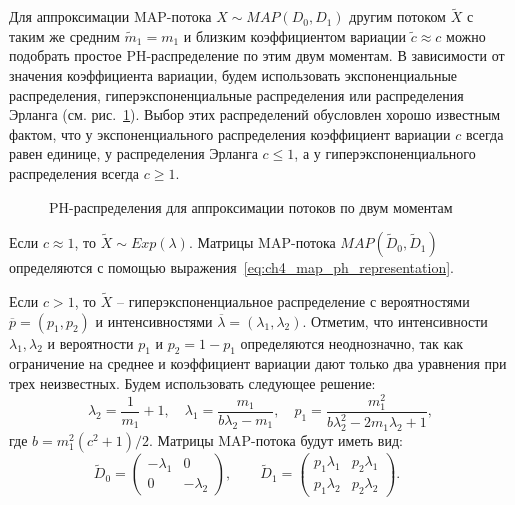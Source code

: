 Для аппроксимации MAP-потока $X \sim MAP(D_0, D_1)$ другим потоком $\tilde{X}$ с таким же средним $\tilde{m}_1 = m_1$ и близким коэффициентом вариации $\tilde{c} \approx c$ можно подобрать простое PH-распределение по этим двум моментам. В зависимости от значения коэффициента вариации, будем использовать экспоненциальные распределения, гиперэкспоненциальные распределения или распределения Эрланга (см. рис.~\ref{fig:ch4_ph2}). Выбор этих распределений обусловлен хорошо известным фактом, что у экспоненциального распределения коэффициент вариации $c$ всегда равен единице, у распределения Эрланга $c \leqslant 1$, а у гиперэкспоненциального распределения всегда $c \geqslant 1$.

\begin{figure}[h]
  \caption{PH-распределения для аппроксимации потоков по двум моментам}
  \label{fig:ch4_ph2}
\end{figure}

Если $c \approx 1$, то $\tilde{X} \sim Exp(\lambda)$. Матрицы MAP-потока $MAP(\tilde{D}_0, \tilde{D}_1)$ определяются с помощью выражения~\eqref{eq:ch4_map_ph_representation}.

Если $c > 1$, то $\tilde{X}$ -- гиперэкспоненциальное распределение с вероятностями $\overline{p} = (p_1, p_2)$ и интенсивностями $\overline{\lambda} = (\lambda_1, \lambda_2)$. Отметим, что интенсивности $\lambda_1, \lambda_2$ и вероятности $p_1$ и $p_2 = 1 - p_1$ определяются неоднозначно, так как ограничение на среднее и коэффициент вариации дают только два уравнения при трех неизвестных. Будем использовать следующее решение:
$$
\lambda_2 = \frac{1}{m_1} + 1,\quad \lambda_1 = \frac{m_1}{b \lambda_2 - m_1}, \quad p_1 = \frac{m_1^2}{b \lambda_2^2 - 2 m_1 \lambda_2 + 1},
$$
где $b = m_1^2(c^2 + 1) / 2$. Матрицы MAP-потока будут иметь вид:
$$
\tilde{D}_0 = \left(
    \begin{matrix}
        -\lambda_1 & 0\\
        0 & -\lambda_2
    \end{matrix}
    \right),\qquad
\tilde{D}_1 = \left(
    \begin{matrix}
        p_1 \lambda_1 & p_2 \lambda_1\\
        p_1 \lambda_2 & p_2 \lambda_2
    \end{matrix}
    \right).\qquad
$$

